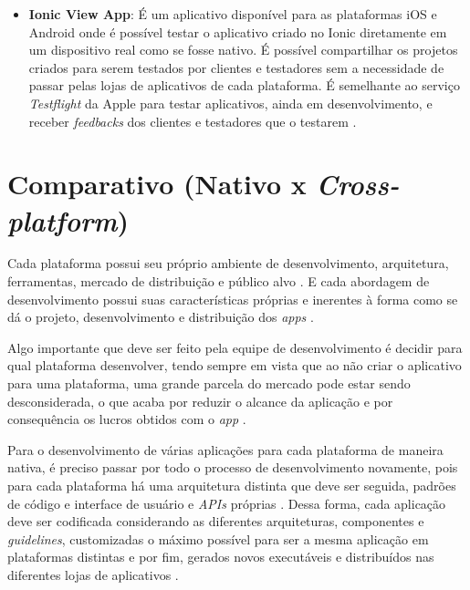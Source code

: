 \begin{itemize}
    \item \textbf{Ionic View App}: É um aplicativo disponível para as plataformas iOS e Android onde é possível testar o 
    aplicativo criado no Ionic diretamente em um dispositivo real como se fosse nativo. É possível compartilhar os projetos criados para serem
    testados por clientes e testadores sem a necessidade de passar pelas lojas de aplicativos de cada plataforma. É semelhante ao serviço 
    \textit{Testflight} da Apple para testar aplicativos, ainda em desenvolvimento, e receber \textit{feedbacks} dos clientes e testadores que o testarem \cite{drifty_ionic_2016-5}. 
     
\end{itemize}

\section{Comparativo (Nativo x \textit{Cross-platform})} \label{section:comparativo}



Cada plataforma possui seu próprio ambiente de desenvolvimento, arquitetura, ferramentas, mercado de distribuição e público alvo \cite{shakshuki_4th_2013}.
E cada abordagem de desenvolvimento possui suas características próprias e inerentes à forma como se dá o projeto, desenvolvimento e distribuição dos \textit{apps} \cite{corral_ant_2012}.

Algo importante que deve ser feito pela equipe de desenvolvimento é decidir para qual plataforma desenvolver, tendo sempre em vista que 
ao não criar o aplicativo para uma plataforma, uma grande parcela do mercado pode estar sendo desconsiderada, o que acaba por reduzir o alcance
da aplicação e por consequência os lucros obtidos com o \textit{app} \cite{corral_ant_2012}. 

Para o desenvolvimento de várias aplicações para cada plataforma de maneira nativa, é preciso passar por todo o processo de desenvolvimento novamente, 
pois para cada plataforma há uma arquitetura distinta que deve ser seguida, padrões de código e interface de usuário e \textit{APIs} próprias \cite{holzinger_making_2012}.
Dessa forma, cada aplicação deve ser codificada considerando as diferentes arquiteturas, componentes e \textit{guidelines}, customizadas o máximo possível 
para ser a mesma aplicação em plataformas distintas e por fim, gerados novos executáveis e distribuídos nas diferentes lojas de aplicativos \cite{corral_ant_2012}.

